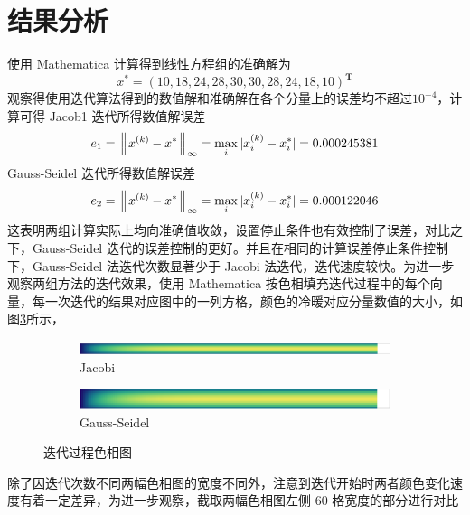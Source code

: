 \documentclass[11pt]{article}
\begin{document}
\section{结果分析}
使用 Mathematica 计算得到线性方程组的准确解为
\begin{equation*}
    x^* =    ( 10, 18, 24, 28, 30, 30, 28, 24, 18, 10 ) ^ \mathbf{T}
\end{equation*}
观察得使用迭代算法得到的数值解和准确解在各个分量上的误差均不超过$10^{-4}$，计算可得 Jacob1 迭代所得数值解误差
\begin{equation*}
    e_1 = \left\Arrowvert x^{(k)} - x^{*} \right\Arrowvert_{\infty} = \max_{i}{|x^{(k)}_i - x^{*}_i|} = 0.000245381
\end{equation*}
Gauss-Seidel 迭代所得数值解误差
\begin{equation*}
    e_2 = \left\Arrowvert x^{(k)} - x^{*} \right\Arrowvert_{\infty} = \max_{i}{|x^{(k)}_i - x^{*}_i|} = 0.000122046
\end{equation*}
这表明两组计算实际上均向准确值收敛，设置停止条件也有效控制了误差，对比之下，Gauss-Seidel 迭代的误差控制的更好。并且在相同的计算误差停止条件控制下，Gauss-Seidel 法迭代次数显著少于 Jacobi 法迭代，迭代速度较快。为进一步观察两组方法的迭代效果，使用 Mathematica 按色相填充迭代过程中的每个向量，每一次迭代的结果对应图中的一列方格，颜色的冷暖对应分量数值的大小，如图\ref{figure:1}所示，
\begin{figure}[h]
    \centering
    \begin{subfigure}{\textwidth}
        \includegraphics[scale = 0.32]{Figure/Jacobi_284.pdf}
        \caption{Jacobi}
        \label{figure:Jacobi-1}
    \end{subfigure}
    \begin{subfigure}{\textwidth}
        \includegraphics[scale = 0.32]{Figure/Gauss_Seidel_151.pdf}
        \caption{Gauss-Seidel}
        \label{figure:Gauss-Seidel-1}
    \end{subfigure}
    \caption{迭代过程色相图}
    \label{figure:1}
\end{figure}
除了因迭代次数不同两幅色相图的宽度不同外，注意到迭代开始时两者颜色变化速度有着一定差异，为进一步观察，截取两幅色相图左侧 60 格宽度的部分进行对比
\end{document}
